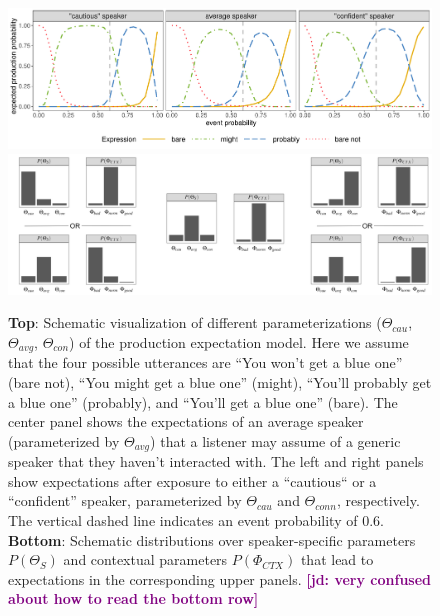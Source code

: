 \documentclass[man,floatsintext]{apa6}
\newcommand{\jd}[1]{\textcolor{Purple}{\bf [jd: #1]}}
\begin{document}
\begin{figure}[th!]
    \centering

    \includegraphics[width=\textwidth]{model-visualization-predictions.pdf}
     \includegraphics[width=\textwidth]{distribution-combinations.png}
    \caption{\textbf{Top}: Schematic visualization of different parameterizations ($\Theta_{cau}$, $\Theta_{avg}$, $\Theta_{con}$) of the production expectation model. Here we assume that the four possible utterances are ``You won't get a blue one'' (bare not), ``You might get a blue one'' (might), ``You'll probably get a blue one'' (probably), and ``You'll get a blue one'' (bare). The center panel shows the expectations of an average speaker (parameterized by $\Theta_{avg}$) that a listener may assume of a generic speaker that they haven't interacted with. The left and right panels show expectations after exposure to either a ``cautious`` or a ``confident'' speaker, parameterized by $\Theta_{cau}$ and $\Theta_{conn}$, respectively. The vertical dashed line indicates an event probability of 0.6. \\
    \textbf{Bottom}: Schematic distributions over speaker-specific parameters $P(\Theta_S)$ and contextual parameters $P(\Phi_{CTX})$ that lead to expectations in the corresponding upper panels. \jd{very confused about how to read the bottom row}}
    \label{fig:model-viz}
\end{figure}
\end{document}
